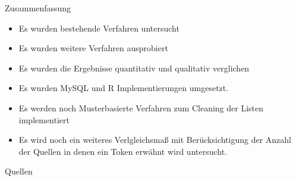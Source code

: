 \documentclass{beamer}
\begin{document}
\begin{frame}{Zusammenfassung}
	\begin{itemize}
		\item{Es wurden bestehende Verfahren untersucht}
		\item{Es wurden weitere Verfahren ausprobiert}
		\item{Es wurden die Ergebnisse quantitativ und qualitativ verglichen}
		\item{Es wurden MySQL und R Implementierungen umgesetzt.}
		\item{Es werden noch Musterbasierte Verfahren zum Cleaning der Listen implementiert}
		\item{Es wird noch ein weiteres Verlgleichsmaß mit Ber\"ucksichtigung der Anzahl der Quellen in denen ein Token erw\"ahnt wird untersucht.}
	\end{itemize}
\end{frame}



\begin{frame}[allowframebreaks]{Quellen}
	\nocite{*}
	
    
\end{frame}
\end{document}
